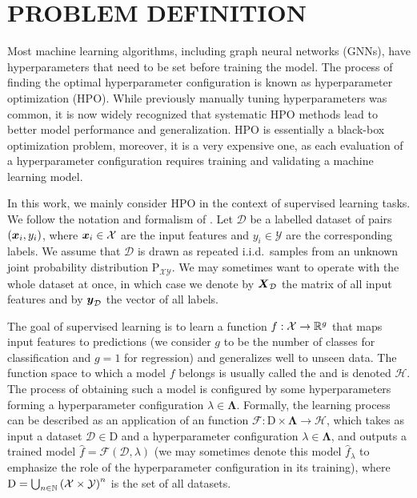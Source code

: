 \section{\uppercase{Problem Definition}}
\label{sec:context}

Most machine learning algorithms, including graph neural networks (GNNs), have hyperparameters that need to be set before training the model. The process of finding the optimal hyperparameter configuration is known as hyperparameter optimization (HPO). While previously manually tuning hyperparameters was common, it is now widely recognized that systematic HPO methods lead to better model performance and generalization. HPO is essentially a black-box optimization problem, moreover, it is a very expensive one, as each evaluation of a hyperparameter configuration requires training and validating a machine learning model.

In this work, we mainly consider HPO in the context of supervised learning tasks. We follow the notation and formalism of \cite{bischl_hyperparameter_2023}. Let \( \mathcal{D} \) be a labelled dataset of pairs \( \left( \boldsymbol{x}_i, y_i \right) \), where \( \boldsymbol{x}_i \in \mathcal{X} \) are the input features and \( y_i \in \mathcal{Y} \) are the corresponding labels. We assume that \( \mathcal{D} \) is drawn as repeated i.i.d.\ samples from an unknown joint probability distribution \( \mathrm{P}_{\mathcal{X}\mathcal{Y}} \). We may sometimes want to operate with the whole dataset at once, in which case we denote by \( \boldsymbol{X}_\mathcal{D} \) the matrix of all input features and by \( \boldsymbol{y}_\mathcal{D} \) the vector of all labels.

The goal of supervised learning is to learn a function \( f: \mathcal{X} \to \mathbb{R}^g \) that maps input features to predictions (we consider \( g \) to be the number of classes for classification and \( g = 1 \) for regression) and generalizes well to unseen data. The function space to which a model \( f \) belongs is usually called the  and is denoted \( \mathscr{H} \). The process of obtaining such a model is configured by some hyperparameters forming a hyperparameter configuration \( \lambda \in \boldsymbol\Lambda \). Formally, the learning process can be described as an application of an  function \( \mathscr{F} : \mathrm{D} \times \boldsymbol\Lambda \to \mathscr{H} \), which takes as input a dataset \( \mathcal{D} \in \mathrm{D} \) and a hyperparameter configuration \( \lambda \in \boldsymbol\Lambda \), and outputs a trained model \( \hat{f} = \mathscr{F} ( \mathcal{D}, \lambda ) \) (we may sometimes denote this model \( \hat{f}_\lambda \) to emphasize the role of the hyperparameter configuration in its training), where \( \mathrm{D} = \bigcup_{n \in \mathbb{N}} \left( \mathcal{X} \times \mathcal{Y} \right)^n \) is the set of all datasets.

